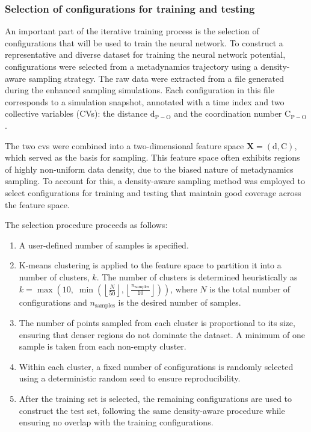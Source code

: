 \subsubsection{Selection of configurations for training and testing}

An important part of the iterative training process is the selection of configurations that will be used to train the neural network. To construct a representative and diverse dataset for training the neural network potential, configurations were selected from a metadynamics trajectory using a density-aware sampling strategy. The raw data were extracted from a file generated during the enhanced sampling simulations. Each configuration in this file corresponds to a simulation snapshot, annotated with a time index and two collective variables (CVs): the distance $\mathrm{d}_{\mathrm{P}-\mathrm{O}}$ and the coordination number $\mathrm{C}_{\mathrm{P}-\mathrm{O}}$.

The two \acp{cv} were combined into a two-dimensional feature space $\mathbf{X} = (\mathrm{d}, \mathrm{C})$, which served as the basis for sampling. This feature space often exhibits regions of highly non-uniform data density, due to the biased nature of metadynamics sampling. To account for this, a density-aware sampling method was employed to select configurations for training and testing that maintain good coverage across the feature space.

The selection procedure proceeds as follows:
\begin{enumerate}
    \item A user-defined number of samples is specified.
    \item K-means clustering is applied to the feature space to partition it into a number of clusters, $k$. The number of clusters is determined heuristically as $k = \max\left(10, \; \min\left(\left\lfloor \frac{N}{50} \right\rfloor, \left\lfloor \frac{n_\text{samples}}{10} \right\rfloor \right)\right)$, where $N$ is the total number of configurations and $n_\text{samples}$ is the desired number of samples.
    \item The number of points sampled from each cluster is proportional to its size, ensuring that denser regions do not dominate the dataset. A minimum of one sample is taken from each non-empty cluster.
    \item Within each cluster, a fixed number of configurations is randomly selected using a deterministic random seed to ensure reproducibility.
    \item After the training set is selected, the remaining configurations are used to construct the test set, following the same density-aware procedure while ensuring no overlap with the training configurations.
\end{enumerate}

